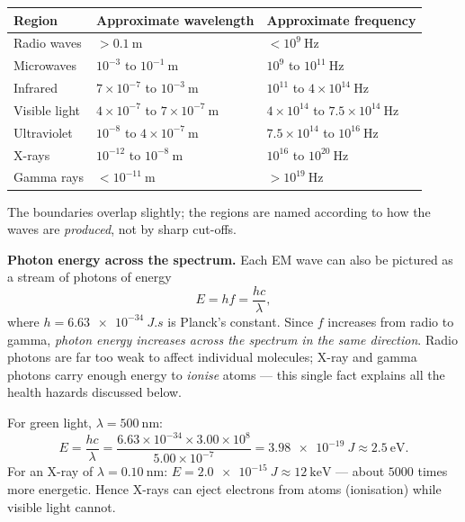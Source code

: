 \documentclass[11pt]{article}
\begin{document}
\begin{aretenir}
\begin{center}
\begin{tabularx}{\linewidth}{|l|X|X|}
\hline
\rowcolor{popblueL} \textbf{Region} & \textbf{Approximate wavelength} & \textbf{Approximate frequency} \\
\hline
Radio waves & $> 0.1\ \mathrm{m}$ & $< 10^{9}\ \mathrm{Hz}$ \\
\hline
Microwaves & $10^{-3}$ to $10^{-1}\ \mathrm{m}$ & $10^{9}$ to $10^{11}\ \mathrm{Hz}$ \\
\hline
Infrared & $7\times10^{-7}$ to $10^{-3}\ \mathrm{m}$ & $10^{11}$ to $4\times10^{14}\ \mathrm{Hz}$ \\
\hline
Visible light & $4\times10^{-7}$ to $7\times10^{-7}\ \mathrm{m}$ & $4\times10^{14}$ to $7.5\times10^{14}\ \mathrm{Hz}$ \\
\hline
Ultraviolet & $10^{-8}$ to $4\times10^{-7}\ \mathrm{m}$ & $7.5\times10^{14}$ to $10^{16}\ \mathrm{Hz}$ \\
\hline
X-rays & $10^{-12}$ to $10^{-8}\ \mathrm{m}$ & $10^{16}$ to $10^{20}\ \mathrm{Hz}$ \\
\hline
Gamma rays & $< 10^{-11}\ \mathrm{m}$ & $> 10^{19}\ \mathrm{Hz}$ \\
\hline
\end{tabularx}
\end{center}
The boundaries overlap slightly; the regions are named according to how the waves are \emph{produced}, not by sharp cut-offs.
\end{aretenir}

\textbf{Photon energy across the spectrum.} Each EM wave can also be pictured as a stream of photons of energy
\[ E = hf = \frac{hc}{\lambda}, \]
where $h = \SI{6.63e-34}{J.s}$ is Planck's constant. Since $f$ increases from radio to gamma, \emph{photon energy increases across the spectrum in the same direction}. Radio photons are far too weak to affect individual molecules; X-ray and gamma photons carry enough energy to \emph{ionise} atoms — this single fact explains all the health hazards discussed below.

\begin{exemplebox}
For green light, $\lambda = 500\ \mathrm{nm}$:
\[ E = \frac{hc}{\lambda} = \frac{6.63\times10^{-34}\times 3.00\times10^{8}}{5.00\times10^{-7}} = \SI{3.98e-19}{J} \approx 2.5\ \mathrm{eV}. \]
For an X-ray of $\lambda = 0.10\ \mathrm{nm}$: $E = \SI{2.0e-15}{J} \approx 12\ \mathrm{keV}$ — about $5000$ times more energetic. Hence X-rays can eject electrons from atoms (ionisation) while visible light cannot.
\end{exemplebox}
\end{document}

